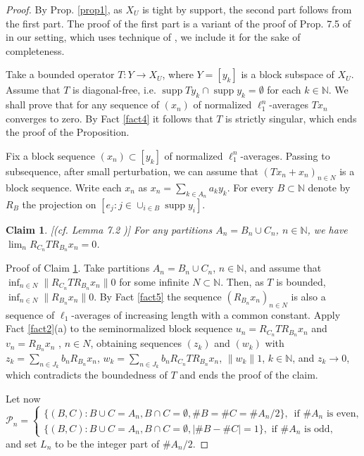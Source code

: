 \documentclass{amsart}
\newtheorem{claim}{Claim}
\numberwithin{subsection}{section}
\numberwithin{equation}{section}
\begin{document}
\begin{proof} By Prop. \ref{prop1}, as $X_U$ is tight by support, the second part follows from the first part. The proof of the first part is a variant of the proof of Prop. 7.5 of \cite{ABR} in our setting, which uses technique of \cite{ALT}, we include it for the sake of completeness. 

Take a bounded operator $T:Y\to X_U$, where $Y=[y_k]$ is a block subspace of $X_U$. Assume that $T$ is diagonal-free, i.e. $\operatorname{supp} Ty_k\cap\operatorname{supp} y_k=\emptyset$ for each $k\in{{\mathbb{N}}}$. We shall prove that for any sequence of $(x_n)$ of normalized $\ell_1^n$-averages $Tx_n$ converges to zero. By Fact \ref{fact4} it follows that $T$ is strictly singular, which ends the proof of the Proposition. 

Fix a block sequence $(x_n)\subset [y_k]$ of normalized $\ell_1^n$-averages. Passing to subsequence, after small perturbation, we can assume that $(Tx_{n}+x_{n})_{n\in N}$ is a block sequence. Write each $x_n$ as $x_{n}=\sum_{k\in A_{n}}a_{k}y_{k}$. For every  $B\subset {{\mathbb{N}}}$  denote by  $R_{B}$  the projection on $[e_{j}:j\in\cup_{i\in B}\operatorname{supp} y_{i}]$. 
\begin{claim}\label{partition}[(cf. Lemma 7.2 \cite{ABR})]
For any partitions $A_n=B_{n}\cup C_{n}$, $n\in{{\mathbb{N}}}$, we have  $\lim_{n} R_{C_{n}}TR_{B_{n}}x_{n}=0$.
\end{claim}
Proof of Claim \ref{partition}. Take partitions $A_n=B_n\cup C_n$, $n\in{{\mathbb{N}}}$, and assume that $\inf_{n\in N}{\lVert R_{C_{n}}TR_{B_{n}}x_{n}\rVert}0$ for some infinite $N\subset{{\mathbb{N}}}$. Then, as $T$ is bounded, $\inf_{n\in N}{\lVert R_{B_n}x_n\rVert}0$. By Fact \ref{fact5} the sequence $(R_{B_n}x_n)_{n\in N}$ is also a sequence of $\ell_1$-averages of increasing length with a common constant. Apply Fact \ref{fact2}(a) to the seminormalized block sequence $u_n=R_{C_{n}}TR_{B_{n}}x_{n}$ and  $v_n=R_{B_{n}}x_{n}$ , $n\in N$, obtaining sequences $(z_k)$ and $(w_k)$ with $z_k=\sum_{n\in J_k}b_nR_{B_n}x_n$, $w_k=\sum_{n\in J_k}b_nR_{C_n}TR_{B_n}x_n$, ${\lVert w_k\rVert}1$, $k\in{{\mathbb{N}}}$, and $z_k\to 0$, which contradicts the boundedness of $T$ and ends the proof of the claim.

Let now
$$
\mathcal{P}_{n}=
\begin{cases}
\{(B,C):B\cup C=A_{n}, B\cap C=\emptyset, \# B=\# C=\# A_{n}/2\} , \,\,\,\textrm{if $\# A_{n}$  is even},
\\
\{(B,C):B\cup C=A_{n}, B\cap C=\emptyset, |\# B-\# C|=1\} , \,\,\textrm{if $\# A_{n}$ is odd},
\end{cases}
$$
and set $L_{n}$ to be the integer part of $\# A_{n}/2$. 


\end{proof}
\end{document}

